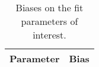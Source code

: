 \begin{table}
  \centering
  \begin{tabular}{cc}
  \toprule
      Parameter & Bias \\
  \midrule
      \bottomrule
  \end{tabular}
  \caption{Biases on the fit parameters of interest.}
\label{tab:biases}
\end{table}
